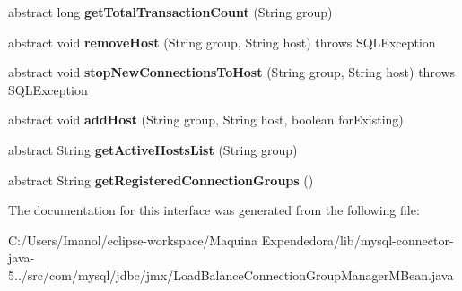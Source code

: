 \begin{DoxyCompactItemize}
\item 
\mbox{\label{interfacecom_1_1mysql_1_1jdbc_1_1jmx_1_1_load_balance_connection_group_manager_m_bean_aaf3ef882a5280e68c31fc45f525d5c0e}} 
abstract long {\bfseries get\+Total\+Transaction\+Count} (String group)
\item 
\mbox{\label{interfacecom_1_1mysql_1_1jdbc_1_1jmx_1_1_load_balance_connection_group_manager_m_bean_a7a677dfa70003ae04a708633a8e06bf8}} 
abstract void {\bfseries remove\+Host} (String group, String host)  throws S\+Q\+L\+Exception
\item 
\mbox{\label{interfacecom_1_1mysql_1_1jdbc_1_1jmx_1_1_load_balance_connection_group_manager_m_bean_a0c02903089ebd76f8c100d7fed65f843}} 
abstract void {\bfseries stop\+New\+Connections\+To\+Host} (String group, String host)  throws S\+Q\+L\+Exception
\item 
\mbox{\label{interfacecom_1_1mysql_1_1jdbc_1_1jmx_1_1_load_balance_connection_group_manager_m_bean_a71910631b1d07b0c4f36d5b4a53d1641}} 
abstract void {\bfseries add\+Host} (String group, String host, boolean for\+Existing)
\item 
\mbox{\label{interfacecom_1_1mysql_1_1jdbc_1_1jmx_1_1_load_balance_connection_group_manager_m_bean_a59bcffbd3733a14e7a17de45645439b0}} 
abstract String {\bfseries get\+Active\+Hosts\+List} (String group)
\item 
\mbox{\label{interfacecom_1_1mysql_1_1jdbc_1_1jmx_1_1_load_balance_connection_group_manager_m_bean_aab3649482b819734dd6d01d03204b06c}} 
abstract String {\bfseries get\+Registered\+Connection\+Groups} ()
\end{DoxyCompactItemize}


The documentation for this interface was generated from the following file\+:\begin{DoxyCompactItemize}
\item 
C\+:/\+Users/\+Imanol/eclipse-\/workspace/\+Maquina Expendedora/lib/mysql-\/connector-\/java-\/5../src/com/mysql/jdbc/jmx/Load\+Balance\+Connection\+Group\+Manager\+M\+Bean.\+java\end{DoxyCompactItemize}

